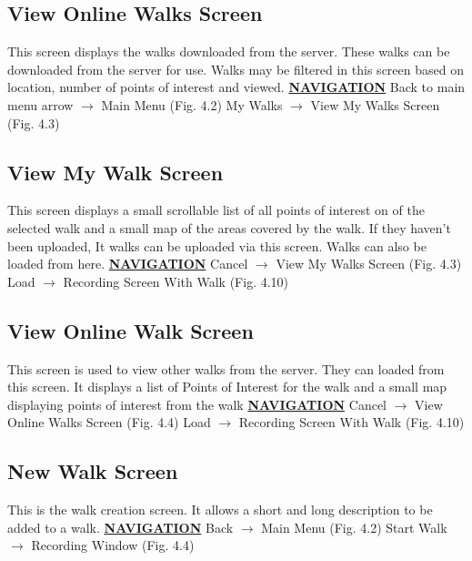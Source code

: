 \documentclass[12pt]{article}
\begin{document}
\subsection{View Online Walks Screen}
\par{This screen displays the walks downloaded from the server. These walks can be downloaded
from the server for use. Walks may be filtered in this screen based on location, number of
points of interest and viewed.}\newline
\textbf{\underline{NAVIGATION}} \newline 
Back to main menu arrow $\rightarrow$ Main Menu (Fig. 4.2) \newline
My Walks $\rightarrow$ View My Walks Screen (Fig. 4.3)\newline
\subsection{View My Walk Screen}
\par{This screen displays a small scrollable list of all points of interest on of the selected walk and
a small map of the areas covered by the walk. If they haven’t been uploaded, It walks can be
uploaded via this screen. Walks can also be loaded from here.} \newline
\textbf{\underline{NAVIGATION}} \newline 
Cancel $\rightarrow$ View My Walks Screen (Fig. 4.3) \newline
Load $\rightarrow$ Recording Screen With Walk (Fig. 4.10) \newline
\subsection{View Online Walk Screen}
\par{This screen is used to view other walks from the server. They can loaded from this screen. It
displays a list of Points of Interest for the walk and a small map displaying points of interest
from the walk}\newline
\textbf{\underline{NAVIGATION}} \newline 
Cancel $\rightarrow$ View Online Walks Screen (Fig. 4.4) \newline
Load $\rightarrow$ Recording Screen With Walk (Fig. 4.10) \newline
\subsection{New Walk Screen}
\par{This is the walk creation screen. It allows a short and long description to be added to a walk.} \newline
\textbf{\underline{NAVIGATION}} \newline
Back $\rightarrow$ Main Menu (Fig. 4.2) \newline
Start Walk $\rightarrow$  Recording Window (Fig. 4.4) \newline
\end{document}
